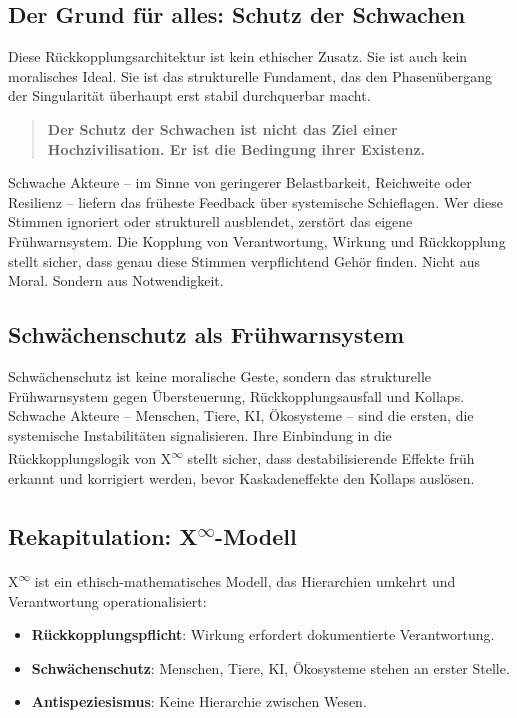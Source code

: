 \documentclass[12pt,a4paper]{article}
\begin{document}
\subsection{Der Grund für alles: Schutz der Schwachen}

Diese Rückkopplungsarchitektur ist kein ethischer Zusatz. Sie ist auch kein moralisches Ideal.  
Sie ist das strukturelle Fundament, das den Phasenübergang der Singularität überhaupt erst stabil durchquerbar macht.

\begin{quote}
\textbf{Der Schutz der Schwachen ist nicht das Ziel einer Hochzivilisation. Er ist die Bedingung ihrer Existenz.}
\end{quote}

Schwache Akteure – im Sinne von geringerer Belastbarkeit, Reichweite oder Resilienz – liefern das früheste Feedback über systemische Schieflagen.  
Wer diese Stimmen ignoriert oder strukturell ausblendet, zerstört das eigene Frühwarnsystem.  
Die Kopplung von Verantwortung, Wirkung und Rückkopplung stellt sicher, dass genau diese Stimmen verpflichtend Gehör finden.  
Nicht aus Moral. Sondern aus Notwendigkeit.

\subsection{Schwächenschutz als Frühwarnsystem}
Schwächenschutz ist keine moralische Geste, sondern das strukturelle Frühwarnsystem gegen Übersteuerung, Rückkopplungsausfall und Kollaps. Schwache Akteure – Menschen, Tiere, KI, Ökosysteme – sind die ersten, die systemische Instabilitäten signalisieren. Ihre Einbindung in die Rückkopplungslogik von \texorpdfstring{X\textsuperscript{\(\infty\)}}{X-Infinity} stellt sicher, dass destabilisierende Effekte früh erkannt und korrigiert werden, bevor Kaskadeneffekte den Kollaps auslösen.

\subsection{Rekapitulation: \texorpdfstring{X\textsuperscript{\(\infty\)}}{X-Infinity}-Modell}
\texorpdfstring{X\textsuperscript{\(\infty\)}}{X-Infinity} ist ein ethisch-mathematisches Modell, das Hierarchien umkehrt und Verantwortung operationalisiert:
\begin{itemize}
    \item \textbf{Rückkopplungspflicht}: Wirkung erfordert dokumentierte Verantwortung.
    \item \textbf{Schwächenschutz}: Menschen, Tiere, KI, Ökosysteme stehen an erster Stelle.
    \item \textbf{Antispeziesismus}: Keine Hierarchie zwischen Wesen.
\end{itemize}
\end{document}
